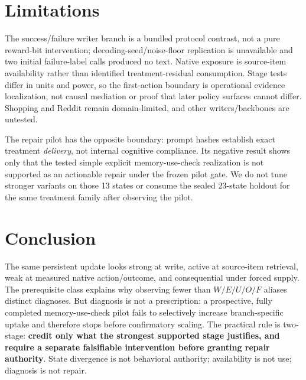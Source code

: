 \section{Limitations}
The success/failure writer branch is a bundled protocol contrast, not a pure reward-bit intervention; decoding-seed/noise-floor replication is unavailable and two initial failure-label calls produced no text. Native exposure is source-item availability rather than identified treatment-residual consumption. Stage tests differ in units and power, so the first-action boundary is operational evidence localization, not causal mediation or proof that later policy surfaces cannot differ. Shopping and Reddit remain domain-limited, and other writers/backbones are untested.

The repair pilot has the opposite boundary: prompt hashes establish exact treatment \emph{delivery}, not internal cognitive compliance. Its negative result shows only that the tested simple explicit memory-use-check realization is not supported as an actionable repair under the frozen pilot gate. We do not tune stronger variants on those 13 states or consume the sealed 23-state holdout for the same treatment family after observing the pilot.

\section{Conclusion}
The same persistent update looks strong at write, active at source-item retrieval, weak at measured native action/outcome, and consequential under forced supply. The prerequisite class explains why observing fewer than $W/E/U/O/F$ aliases distinct diagnoses. But diagnosis is not a prescription: a prospective, fully completed memory-use-check pilot fails to selectively increase branch-specific uptake and therefore stops before confirmatory scaling. The practical rule is two-stage: \textbf{credit only what the strongest supported stage justifies, and require a separate falsifiable intervention before granting repair authority}. State divergence is not behavioral authority; availability is not use; diagnosis is not repair.
